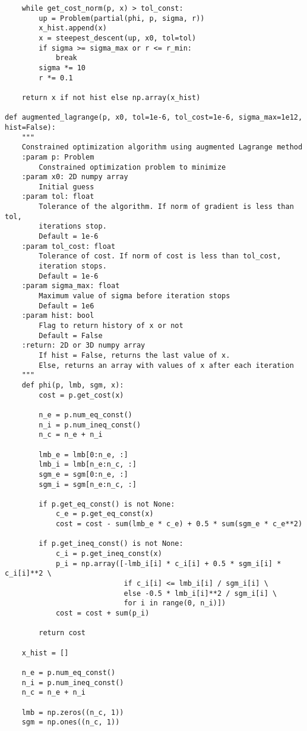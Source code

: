 \begin{lstlisting}
    while get_cost_norm(p, x) > tol_const:
        up = Problem(partial(phi, p, sigma, r))
        x_hist.append(x)
        x = steepest_descent(up, x0, tol=tol)
        if sigma >= sigma_max or r <= r_min:
            break
        sigma *= 10
        r *= 0.1

    return x if not hist else np.array(x_hist)

def augmented_lagrange(p, x0, tol=1e-6, tol_cost=1e-6, sigma_max=1e12, hist=False):
    """
    Constrained optimization algorithm using augmented Lagrange method
    :param p: Problem
        Constrained optimization problem to minimize
    :param x0: 2D numpy array
        Initial guess
    :param tol: float
        Tolerance of the algorithm. If norm of gradient is less than tol,
        iterations stop.
        Default = 1e-6
    :param tol_cost: float
        Tolerance of cost. If norm of cost is less than tol_cost,
        iteration stops.
        Default = 1e-6
    :param sigma_max: float
        Maximum value of sigma before iteration stops
        Default = 1e6
    :param hist: bool
        Flag to return history of x or not
        Default = False
    :return: 2D or 3D numpy array
        If hist = False, returns the last value of x.
        Else, returns an array with values of x after each iteration
    """
    def phi(p, lmb, sgm, x):
        cost = p.get_cost(x)

        n_e = p.num_eq_const()
        n_i = p.num_ineq_const()
        n_c = n_e + n_i

        lmb_e = lmb[0:n_e, :]
        lmb_i = lmb[n_e:n_c, :]
        sgm_e = sgm[0:n_e, :]
        sgm_i = sgm[n_e:n_c, :]

        if p.get_eq_const() is not None:
            c_e = p.get_eq_const(x)
            cost = cost - sum(lmb_e * c_e) + 0.5 * sum(sgm_e * c_e**2)

        if p.get_ineq_const() is not None:
            c_i = p.get_ineq_const(x)
            p_i = np.array([-lmb_i[i] * c_i[i] + 0.5 * sgm_i[i] * c_i[i]**2 \
                            if c_i[i] <= lmb_i[i] / sgm_i[i] \
                            else -0.5 * lmb_i[i]**2 / sgm_i[i] \
                            for i in range(0, n_i)])
            cost = cost + sum(p_i)

        return cost

    x_hist = []

    n_e = p.num_eq_const()
    n_i = p.num_ineq_const()
    n_c = n_e + n_i

    lmb = np.zeros((n_c, 1))
    sgm = np.ones((n_c, 1))


\end{lstlisting}
